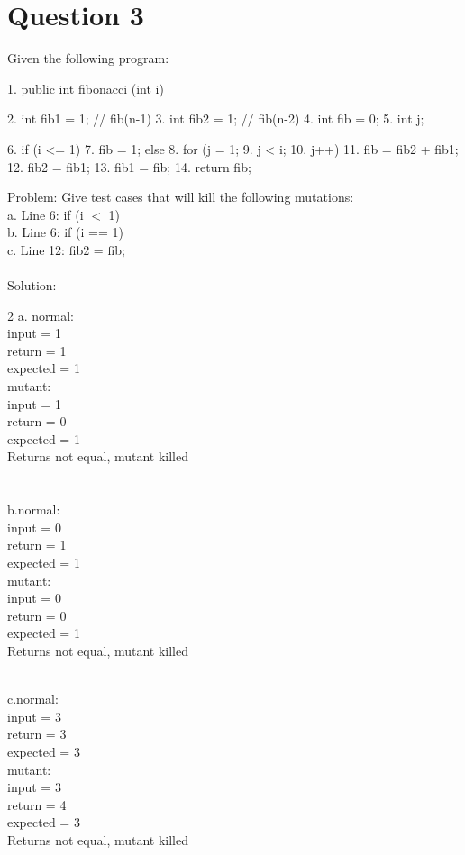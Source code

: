 \documentclass{article}
\begin{document}
\section*{Question 3}
Given the following program:
\begin{spverbatim}
	1. public int fibonacci (int i) { 
	2.     int fib1 = 1;    // fib(n-1)
	3.     int fib2 = 1;    // fib(n-2)
	4.     int fib = 0;
	5.     int j;

	6.     if (i <= 1) 
	7.         fib = 1;
	       else 
	8.        for (j = 1;
	9.             j < i;
	10.             j++) {
	11.            fib = fib2 + fib1;
	12.            fib2 = fib1;
	13.            fib1 = fib;
	          }
	14.    return fib;		
	   }
\end{spverbatim} \bigskip
\noindent
Problem: Give test cases that will kill the following mutations: \\
a. Line 6: if (i $<$ 1)	\\
b. Line 6: if (i == 1)	\\
c. Line 12: fib2 = fib;	\\\\
Solution:\\
\begin{multicols}{2}
\noindent
a. normal: \\
	input = 1 \\
	return = 1 \\
	expected = 1 \\
	mutant: \\
	input = 1 \\
	return = 0 \\
	expected = 1\\
Returns not equal, mutant killed \\\\\\
b.normal: \\
input = 0 \\
return = 1 \\
expected = 1 \\
mutant: \\
input = 0 \\
return = 0 \\
expected = 1 \\
Returns not equal, mutant killed \\\\
\end{multicols}
\noindent
c.normal: \\
input = 3 \\
return = 3 \\
expected = 3 \\
mutant: \\
input = 3 \\
return = 4 \\
expected = 3 \\
Returns not equal, mutant killed \\\\

	
\end{document}
